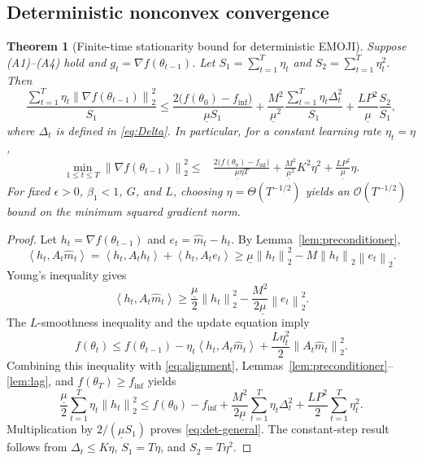 \documentclass[11pt]{article}
\newtheorem{theorem}{Theorem}[section]
\newcommand{\norm}[1]{\left\lVert #1\right\rVert}
\newcommand{\ip}[2]{\left\langle #1,#2\right\rangle}
\newcommand{\cO}{\mathcal{O}}
\begin{document}
\subsection{Deterministic nonconvex convergence}
\begin{theorem}[Finite-time stationarity bound for deterministic EMOJI]\label{thm:det}
Suppose (A1)--(A4) hold and $g_t=\nabla f(\theta_{t-1})$. Let
$S_1=\sum_{t=1}^T\eta_t$ and $S_2=\sum_{t=1}^T\eta_t^2$. Then
\begin{equation}
 \frac{\sum_{t=1}^T\eta_t\norm{\nabla f(\theta_{t-1})}_2^2}{S_1}
 \le
 \frac{2\bigl(f(\theta_0)-f_{\inf}\bigr)}{\underline\mu S_1}
 +\frac{M^2}{\underline\mu^2}
   \frac{\sum_{t=1}^T\eta_t\Delta_t^2}{S_1}
 +\frac{LP^2}{\underline\mu}\frac{S_2}{S_1},
 \label{eq:det-general}
\end{equation}
where $\Delta_t$ is defined in \eqref{eq:Delta}. In particular, for a constant learning rate $\eta_t=\eta$,
\begin{align}
 \min_{1\le t\le T}\norm{\nabla f(\theta_{t-1})}_2^2
 \le{}&\frac{2\bigl(f(\theta_0)-f_{\inf}\bigr)}{\underline\mu\eta T}
 +\frac{M^2}{\underline\mu^2}K^2\eta^2
 +\frac{LP^2}{\underline\mu}\eta.\label{eq:det-constant}
\end{align}
For fixed $\epsilon>0$, $\beta_1<1$, $G$, and $L$, choosing $\eta=\Theta(T^{-1/2})$ yields an $\cO(T^{-1/2})$ bound on the minimum squared gradient norm.
\end{theorem}

\begin{proof}
Let $h_t=\nabla f(\theta_{t-1})$ and $e_t=\widehat m_t-h_t$. By Lemma~\ref{lem:preconditioner},
\[
 \ip{h_t}{A_t\widehat m_t}
 =\ip{h_t}{A_th_t}+\ip{h_t}{A_te_t}
 \ge\underline\mu\norm{h_t}_2^2-M\norm{h_t}_2\norm{e_t}_2.
\]
Young's inequality gives
\begin{equation}
 \ip{h_t}{A_t\widehat m_t}
 \ge\frac{\underline\mu}{2}\norm{h_t}_2^2
 -\frac{M^2}{2\underline\mu}\norm{e_t}_2^2.
 \label{eq:alignment}
\end{equation}
The $L$-smoothness inequality and the update equation imply
\[
 f(\theta_t)\le f(\theta_{t-1})
 -\eta_t\ip{h_t}{A_t\widehat m_t}
 +\frac{L\eta_t^2}{2}\norm{A_t\widehat m_t}_2^2.
\]
Combining this inequality with \eqref{eq:alignment}, Lemmas~\ref{lem:preconditioner}--\ref{lem:lag}, and $f(\theta_T)\ge f_{\inf}$ yields
\[
 \frac{\underline\mu}{2}\sum_{t=1}^T\eta_t\norm{h_t}_2^2
 \le f(\theta_0)-f_{\inf}
 +\frac{M^2}{2\underline\mu}\sum_{t=1}^T\eta_t\Delta_t^2
 +\frac{LP^2}{2}\sum_{t=1}^T\eta_t^2.
\]
Multiplication by $2/(\underline\mu S_1)$ proves \eqref{eq:det-general}. The constant-step result follows from $\Delta_t\le K\eta$, $S_1=T\eta$, and $S_2=T\eta^2$.
\end{proof}
\end{document}
